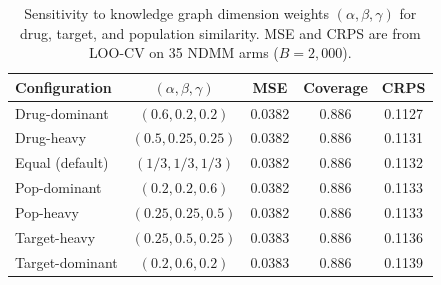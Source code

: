 \documentclass[12pt]{article}
\begin{document}
\begin{table}[ht]
\centering
\caption{Sensitivity to knowledge graph dimension weights $(\alpha, \beta, \gamma)$ for drug, target, and population similarity. MSE and CRPS are from LOO-CV on 35 NDMM arms ($B = 2{,}000$).}
\label{tab:supp_kg_weights}
\begin{tabular}{lcccc}
\toprule
Configuration & $(\alpha, \beta, \gamma)$ & MSE & Coverage & CRPS \\
\midrule
Drug-dominant & $(0.6, 0.2, 0.2)$ & 0.0382 & 0.886 & 0.1127 \\
Drug-heavy & $(0.5, 0.25, 0.25)$ & 0.0382 & 0.886 & 0.1131 \\
Equal (default) & $(1/3, 1/3, 1/3)$ & 0.0382 & 0.886 & 0.1132 \\
Pop-dominant & $(0.2, 0.2, 0.6)$ & 0.0382 & 0.886 & 0.1133 \\
Pop-heavy & $(0.25, 0.25, 0.5)$ & 0.0382 & 0.886 & 0.1133 \\
Target-heavy & $(0.25, 0.5, 0.25)$ & 0.0383 & 0.886 & 0.1136 \\
Target-dominant & $(0.2, 0.6, 0.2)$ & 0.0383 & 0.886 & 0.1139 \\
\bottomrule
\end{tabular}
\end{table}
\end{document}
